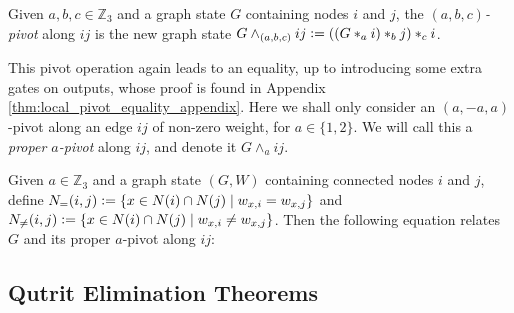 
\begin{definition}\label{def:local_pivot_qutrit}
	Given $a,b,c \in \mathbb{Z}_3$ and a graph state $G$ containing nodes $i$ and $j$, the \emph{$(a,b,c)$-pivot} along $ij$ is the new graph state $G \wedge_{(a,b,c)} ij \vcentcolon= ((G *_a i) *_b j) *_c i$. 
\end{definition}

This pivot operation again leads to an equality, up to introducing some extra gates on outputs, whose proof is found in Appendix \ref{thm:local_pivot_equality_appendix}. Here we shall only consider an $(a,-a,a)$-pivot along an edge $ij$ of non-zero weight, for $a \in \{1, 2\}$. We will call this a \emph{proper $a$-pivot} along $ij$, and denote it $G \wedge_a ij$.

\begin{theorem}\label{thm:local_pivot_equality}
	Given $a \in \mathbb{Z}_3$ and a graph state $(G, W)$ containing connected nodes $i$ and $j$, define $N_{=}(i, j) \vcentcolon= \left\{x \in N(i) \cap N(j) \mid w_{x,i} = w_{x,j} \right\}$ and $N_{\neq}(i, j) \vcentcolon= \left\{x \in N(i) \cap N(j) \mid w_{x,i} \neq w_{x,j} \right\}$. Then the following equation relates $G$ and its proper $a$-pivot along $ij$:

\end{theorem}

\subsection{Qutrit Elimination Theorems}

